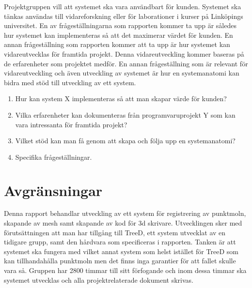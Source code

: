 Projektgruppen vill att systemet ska vara användbart för kunden. Systemet ska tänkas användas till vidareforskning eller för laborationer i kurser på Linköpings universitet. En av frågeställningarna som rapporten kommer ta upp är således hur systemet kan implementeras så att det maximerar värdet för kunden. En annan frågeställning som rapporten kommer att ta upp är hur systemet kan vidareutvecklas för framtida projekt. Denna vidareutveckling kommer baseras på de erfarenheter som projektet medför. En annan frågeställning som är relevant för vidareutveckling och även utveckling av systemet är hur en systemanatomi kan bidra med stöd till utveckling av ett system.


\begin{enumerate}
	
\item Hur kan system X implementeras så att man skapar värde för kunden?

\item Vilka erfarenheter kan dokumenteras från programvaruprojekt Y som kan vara intressanta för framtida projekt?

\item Vilket stöd kan man få genom att skapa och följa upp en systemanatomi?

\item Specifika frågeställningar.


\end{enumerate}

\section{Avgränsningar}
\label{sec:delimitations}

Denna rapport behandlar utveckling av ett system för registrering av punktmoln, skapande av mesh samt skapande av kod för 3d skrivare. Utvecklingen sker med förutsättningen att man har tillgång till TreeD, ett system utvecklat av en tidigare grupp, samt den hårdvara som specificeras i rapporten. Tanken är att systemet ska fungera med vilket annat system som helst istället för TreeD som kan tillhandahålla punktmoln men det finns inga garantier för att fallet skulle vara så. Gruppen har 2800 timmar till sitt förfogande och inom dessa timmar ska systemet utvecklas och alla projektrelaterade dokument skrivas. 



